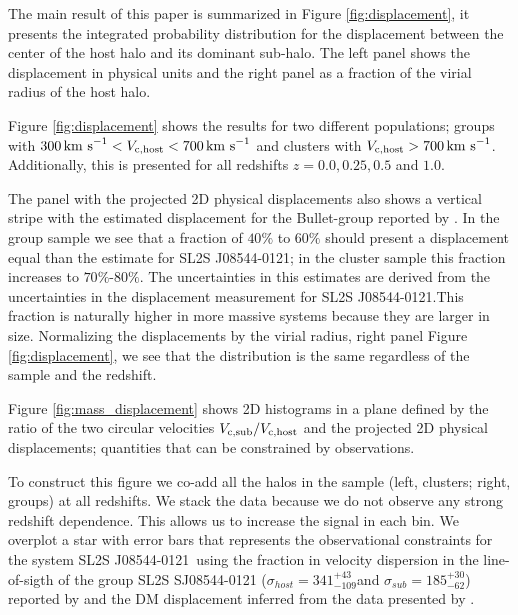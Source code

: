 \documentclass{emulateapj}
\newcommand{\kms}{{\ifmmode{{\mathrm{\,km\ s}^{-1}}}\else{\,km~s$^{-1}$}\fi}}
\newcommand{\bullg}{SL2S J08544-0121}
\begin{document}
The main result of this paper is summarized in Figure
\ref{fig:displacement}, it presents the integrated
probability distribution for the displacement between the center of
the host halo and its dominant sub-halo. The left panel shows
the displacement in physical units and the right panel as a fraction
of the virial radius of the host halo. 

Figure \ref{fig:displacement} shows the results for two different
populations; groups with $300\kms < V_{\rm c, host}<700\kms$ and
clusters with $V_{\rm c,host}>700\kms$. Additionally, this is
presented for all redshifts $z=0.0, 0.25, 0.5$ and $1.0$. 

The panel with the projected 2D physical displacements also shows a
vertical stripe with the estimated displacement for the Bullet-group reported by
\cite{Gastaldello}. In the group sample we see that a fraction of
$40\%$ to $60\%$  should present a displacement equal than the
estimate for \bullg; in the cluster sample this fraction increases to
$70\%$-$80\%$. The uncertainties in this estimates are derived from
the uncertainties in the displacement measurement for \bullg.This
fraction is naturally higher in more massive systems because they are
larger in size. Normalizing the displacements by the virial radius,
right panel Figure \ref{fig:displacement}, we see that the
distribution is the same regardless of the sample and the redshift.

Figure \ref{fig:mass_displacement} shows 2D histograms in a plane
defined by the ratio of the two circular velocities $V_{\rm c,
  sub}/V_{\rm c, host}$ and the projected 2D physical displacements;
quantities that can be constrained by observations. 

To construct this figure we co-add all the halos in the sample (left,
clusters; right, groups) at all redshifts. We stack the data because
we do not observe any strong redshift dependence. This allows
us to increase the signal in each bin. We overplot a star with error
bars that represents the observational constraints for the system
\bullg\ using the fraction in velocity dispersion in the line-of-sigth
of the group SL2S SJ08544-0121 ($\sigma_{host}=341^{+43}_{-109}$\kms and
$\sigma_{sub}=185^{+30}_{-62}$\kms) reported by
\citet{2013A&A...552A..80M} and the DM displacement inferred from the
data presented by \cite{Gastaldello}. 
\end{document}
